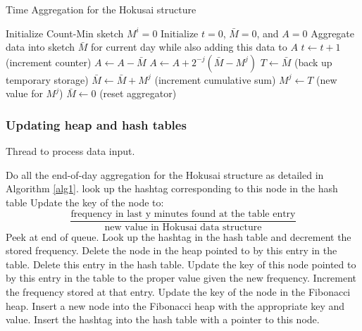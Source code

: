 \documentclass[a4paper,12pt]{article}
\begin{document}
\begin{algorithm}
\caption{Time Aggregation for the Hokusai structure}\label{alg1}
\begin{algorithmic}[1]
	\State Initialize Count-Min sketch $M^i = 0$
\EndFor
\State Initialize $t = 0$, $\bar{M} = 0$, and $A = 0$
	\State Aggregate data into sketch $\bar{M}$ for current day while also adding this data to $A$
	\State $t \leftarrow t + 1$ (increment counter)
	\State $A \leftarrow A - \bar{M}$
		\State $A \leftarrow A + 2^{-j}(\bar{M} - M^j)$
		\State $T \leftarrow \bar{M}$ (back up temporary storage)
		\State $\bar{M} \leftarrow \bar{M} + M^j$ (increment cumulative sum)
		\State $M^j \leftarrow T$ (new value for $M^j$)
	\EndFor
	\State $\bar{M} \leftarrow 0$ (reset aggregator)
\EndWhile
\end{algorithmic}
\end{algorithm}

\subsubsection{Updating heap and hash tables}

\begin{algorithm}
\caption{Thread to process data input.}
\begin{algorithmic}[1]
		\State Do all the end-of-day aggregation for the Hokusai structure as detailed in Algorithm \ref{alg1}.
			\State look up the hashtag corresponding to this node in the hash table
			\State Update the key of the node to: \[\frac{\text{frequency in last y minutes found at the table entry}}{\text{new value in Hokusai data structure}}\]
		\EndFor
	\EndIf
		\State Peek at end of queue.
			\State Look up the hashtag in the hash table and decrement the stored frequency.
				\State Delete the node in the heap pointed to by this entry in the table.
				\State Delete this entry in the hash table.
			\Else	
				\State Update the key of this node pointed to by this entry in the table to the proper value given the new frequency.
			\EndIf
		\EndIf
	\EndIf
		\State Increment the frequency stored at that entry.
		\State Update the key of the node in the Fibonacci heap.
	\Else
		\State Insert a new node into the Fibonacci heap with the appropriate key and value. 
		\State Insert the hashtag into the hash table with a pointer to this node.
 	\EndIf
\EndWhile
\end{algorithmic}
\end{algorithm}
\end{document}
